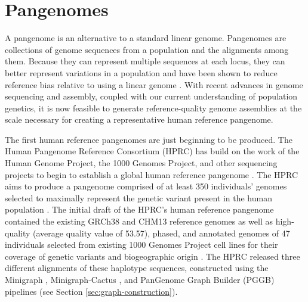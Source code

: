 \documentclass[11pt]{ucscthesis}
\begin{document}

\section{Pangenomes}
\label{sec:background:pangenomes}

A pangenome is an alternative to a standard linear genome.
Pangenomes are collections of genome sequences from a population and the alignments among them.
Because they can represent multiple sequences at each locus, they can better represent variations in a population and have been shown to reduce reference bias relative to using a linear genome \cite{sherman_pan-genomics_2020,noauthor_computational_2016,hprc_pangenome_2023}.
With recent advances in genome sequencing and assembly, coupled with our current understanding of population genetics, it is now feasible to generate reference-quality genome assemblies at the scale necessary for creating a representative human reference pangenome.

The first human reference pangenomes are just beginning to be produced.
The Human Pangenome Reference Consortium (HPRC) has build on the work of the Human Genome Project, the 1000 Genomes Project, and other sequencing projects to begin to establish a global human reference pangenome \cite{hprc_2022}.
The HPRC aims to produce a pangenome comprised of at least 350 individuals' genomes selected to maximally represent the genetic variant present in the human population \cite{hprc_2022}.
The initial draft of the HPRC's human reference pangenome contained the existing GRCh38 and CHM13 reference genomes as well as high-quality (average quality value of 53.57), phased, and annotated genomes of 47 individuals selected from existing 1000 Genomes Project cell lines for their coverage of genetic variants and biogeographic origin \cite{hprc_pangenome_2023}.
The HPRC released three different alignments of these haplotype sequences, constructed using the Minigraph \cite{li_minigraph_2020}, Minigraph-Cactus \cite{minigraph_cactus_2024}, and PanGenome Graph Builder (PGGB) \cite{pggb_2024} pipelines (see Section \ref{sec:graph-construction}). 
\end{document}
